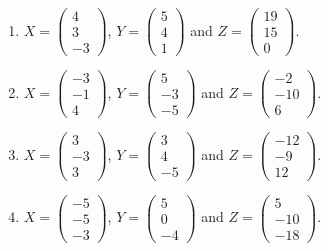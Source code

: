 \begin{enumerate}[label=\arabic*.,  leftmargin=*]
\item $X = \begin{pmatrix} 4 \\ 3 \\ -3 \end{pmatrix}$, $Y = \begin{pmatrix} 5 \\ 4 \\ 1 \end{pmatrix}$ and $Z = \begin{pmatrix} 19 \\ 15 \\ 0 \end{pmatrix}$.
\item $X = \begin{pmatrix} -3 \\ -1 \\ 4 \end{pmatrix}$, $Y = \begin{pmatrix} 5 \\ -3 \\ -5 \end{pmatrix}$ and $Z = \begin{pmatrix} -2 \\ -10 \\ 6 \end{pmatrix}$.
\item $X = \begin{pmatrix} 3 \\ -3 \\ 3 \end{pmatrix}$, $Y = \begin{pmatrix} 3 \\ 4 \\ -5 \end{pmatrix}$ and $Z = \begin{pmatrix} -12 \\ -9 \\ 12 \end{pmatrix}$.
\item $X = \begin{pmatrix} -5 \\ -5 \\ -3 \end{pmatrix}$, $Y = \begin{pmatrix} 5 \\ 0 \\ -4 \end{pmatrix}$ and $Z = \begin{pmatrix} 5 \\ -10 \\ -18 \end{pmatrix}$.

\end{enumerate}
